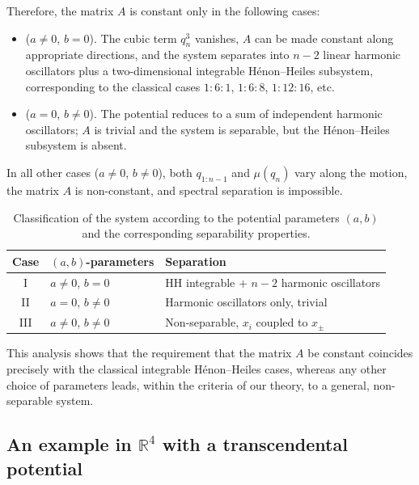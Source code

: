 \documentclass{rendiconti}
\begin{document}
Therefore, the matrix $A$ is constant only in the following cases:

\begin{itemize}
\item ($a\neq 0$, $b=0$). The cubic term $q_n^3$ vanishes, $A$ can be made constant
along appropriate directions, and the system separates into $n-2$ linear
harmonic oscillators plus a two-dimensional integrable H\'enon--Heiles
subsystem, corresponding to the classical cases $1{:}6{:}1$, $1{:}6{:}8$,
$1{:}12{:}16$, etc.
\item ($a=0$, $b\neq 0$). The potential reduces to a sum of independent
harmonic oscillators; $A$ is trivial and the system is separable, but the
H\'enon--Heiles subsystem is absent.
\end{itemize}

In all other cases ($a\neq 0$, $b\neq 0$), both $q_{1:n-1}$ and $\mu(q_n)$ vary
along the motion, the matrix $A$ is non-constant, and spectral separation is
impossible.

\begin{table}[h]
\centering
\label{tab:separation-cases}
\begin{tabular}{|c|l|l|}
\hline
Case & $(a,b)$-parameters & Separation \\ \hline
{\small I} & {\small $a\neq 0$, $b=0$} & {\small HH integrable $+$ $n-2$ harmonic oscillators} \\ \hline
{\small II} & {\small $a=0$, $b\neq 0$} & {\small Harmonic oscillators only, trivial} \\ \hline
{\small III} & {\small $a\neq 0$, $b\neq 0$} & {\small Non-separable, $x_i$ coupled to $x_\pm$} \\ \hline
\end{tabular}
\caption{\small Classification of the system according to the potential parameters
$(a,b)$ and the corresponding separability properties.}
\end{table}

This analysis shows that the requirement that the matrix $A$ be constant
coincides precisely with the classical integrable H\'enon--Heiles cases,
whereas any other choice of parameters leads, within the criteria of our
theory, to a general, non-separable system.


\subsection{An example in $\mathbb{R}^4$ with a transcendental potential}
\end{document}

